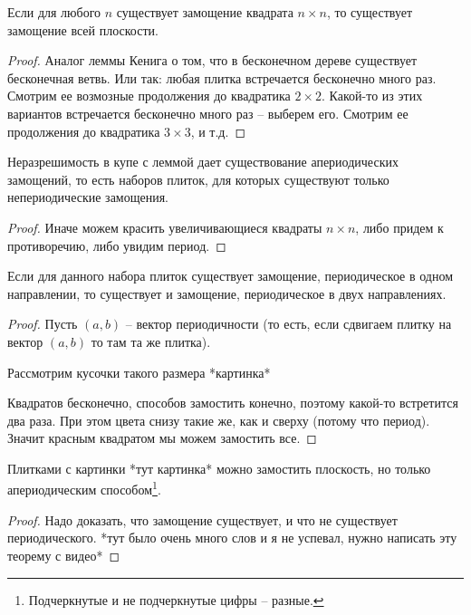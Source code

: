 \begin{lm}
    Если для любого $ n $ существует замощение квадрата $ n \times n $, то существует замощение всей плоскости.
\end{lm}
\begin{proof}
    Аналог леммы Кенига о том, что в бесконечном дереве существует бесконечная ветвь. Или так: любая плитка встречается бесконечно много раз. Смотрим ее возмозные продолжения до квадратика $ 2 \times 2 $. Какой-то из этих вариантов встречается бесконечно много раз -- выберем его. Смотрим ее продолжения до квадратика $ 3 \times 3 $, и т.д.
\end{proof}

\begin{cor}
    Неразрешимость в купе с леммой дает существование апериодических замощений, то есть наборов плиток, для которых существуют только непериодические замощения.
\end{cor}
\begin{proof}
    Иначе можем красить увеличивающиеся квадраты $ n \times n $, либо придем к противоречию,
    либо увидим период.
\end{proof}

\begin{lm}
    Если для данного набора плиток существует замощение, периодическое в одном направлении, то существует и замощение, периодическое в двух направлениях.
\end{lm}
\begin{proof}
    Пусть $(a, b)$ -- вектор периодичности (то есть, если сдвигаем плитку на вектор $ (a, b) $ то там та же плитка).

    Рассмотрим кусочки такого размера *картинка*

    Квадратов бесконечно, способов замостить конечно, поэтому какой-то встретится два раза. При этом цвета снизу такие же,
    как и сверху (потому что период).
    Значит красным квадратом мы можем замостить все.
\end{proof}

\begin{thm}
    Плитками с картинки *тут картинка* можно замостить плоскость, но только апериодическим способом\footnote{Подчеркнутые и не подчеркнутые цифры -- разные.}.
\end{thm}
\begin{proof}
    Надо доказать, что замощение существует, и что не существует периодического.
    *тут было очень много слов и я не успевал, нужно написать эту теорему с видео*
\end{proof}


